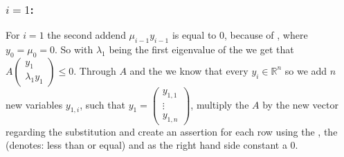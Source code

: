 \subsubsection{$i=1$:}
For $i=1$ the second addend $\mu_{i-1}y_{i-1}$ is equal to $0$, because of , where $y_0 = \mu_0 = 0$. So with $\lambda_1$ being the first eigenvalue of the \updatematrix we get that $A\begin{pmatrix} y_1 \\ \lambda_1 y_1 \end{pmatrix} \le 0$. \newline
Through $A$ and the \domc we know that every $y_i\in \mathbb{R}^n$ so we add $n$ new variables $y_{1,i}$, such that $y_1 = \begin{pmatrix} y_{1,1} \\ \vdots \\ y_{1,n}\end{pmatrix}$, multiply the \updatematrix $A$ by the new vector regarding the substitution and create an assertion for each row using the \smtfactory, the   (denotes: less than or equal) and as the right hand side constant a 0.

